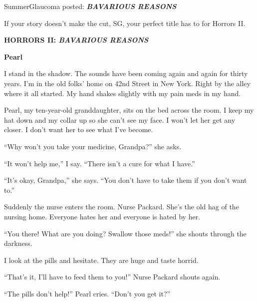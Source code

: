 


SummerGlaucoma posted:
{\bf {\em BAVARIOUS
REASONS}}




If your story doesn't make the cut, SG, your perfect title has to
for Horrors II.



{\bf HORRORS II: {\em BAVARIOUS REASONS}} 

 





{\bf Pearl}



I stand in the shadow. The sounds have been coming again and again
for thirty years. I'm in the old folks' home on 42nd
Street in New York. Right by the alley where it all started. My
hand shakes slightly with my pain meds in my hand.



Pearl, my ten-year-old granddaughter, sits on the bed across the
room. I keep my hat down and my collar up so she can't see my
face. I won't let her get any closer. I don't want her
to see what I've become.



``Why won't you take your medicine, Grandpa?'' she
asks.



``It won't help me,'' I say. ``There
isn't a cure for what I have.''



``It's okay, Grandpa,'' she says. ``You
don't have to take them if you don't want
to.''



Suddenly the nurse enters the room. Nurse Packard. She's the
old hag of the nursing home. Everyone hates her and everyone is
hated by her.



``You there! What are you doing? Swallow those meds!''
she shouts through the darkness.



I look at the pills and hesitate. They are huge and taste
horrid.



``That's it, I'll have to feed them to you!''
Nurse Packard shouts again.



``The pills don't help!'' Pearl cries.
``Don't you get it?''



